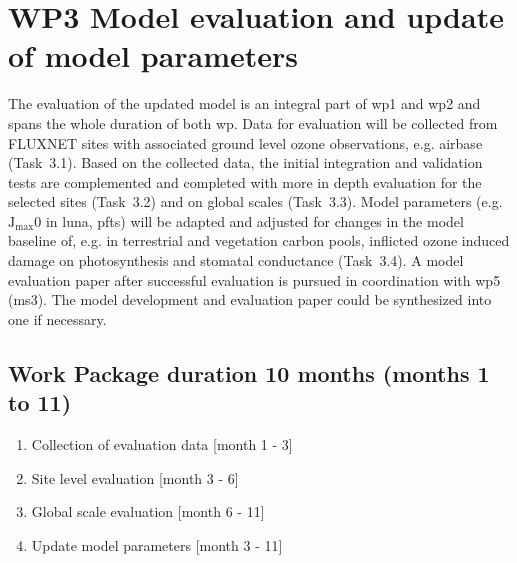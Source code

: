 \section{WP3 Model evaluation and update of model parameters}
\label{sec:wp3}
The evaluation of the updated model is an integral part of \gls{wp}1 and \gls{wp}2 and spans the whole duration of both \gls{wp}. Data for evaluation will be collected from FLUXNET sites with associated ground level ozone observations, e.g. \gls{airbase} (Task~3.1). Based on the collected data, the initial integration and validation tests are complemented and completed with more in depth evaluation for the selected sites (Task~3.2) and on global scales (Task~3.3). Model parameters  (e.g. $\mathrm{J_{max}}$0 in \gls{luna}, \glspl{pft}) will be adapted and adjusted for changes in the model baseline of, e.g. in terrestrial and vegetation carbon pools, inflicted ozone induced damage on photosynthesis and stomatal conductance (Task~3.4). A model evaluation paper after successful evaluation is pursued in coordination with \gls{wp}5 (\gls{ms}3). The model development and evaluation paper could be synthesized into one if necessary.

\subsection*{Work Package duration 10 months (months 1 to 11)}
\begin{enumerate}[start=1,label={T3.\arabic*}]
  \itemsep0pt
\item Collection of evaluation data \hfill [month 1 - 3]
\item Site level evaluation \hfill [month 3 - 6]
\item Global scale evaluation \hfill [month 6 - 11]
\item Update model parameters \hfill [month 3 - 11]
\end{enumerate}

